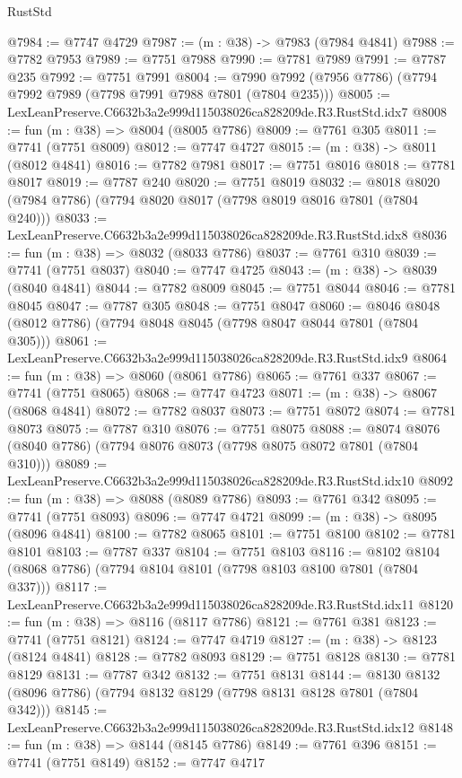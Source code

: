 \begin{lexlean}{RustStd}
\begin{coremodule}
@7984 := @7747 @4729
@7987 := (m : @38) -> @7983 (@7984 @4841)
@7988 := @7782 @7953
@7989 := @7751 @7988
@7990 := @7781 @7989
@7991 := @7787 @235
@7992 := @7751 @7991
@8004 := @7990 @7992 (@7956 @7786) (@7794 @7992 @7989 (@7798 @7991 @7988 @7801 (@7804 @235)))
@8005 := LexLeanPreserve.C6632b3a2e999d115038026ca828209de.R3.RustStd.idx7
@8008 := fun (m : @38) => @8004 (@8005 @7786)
@8009 := @7761 @305
@8011 := @7741 (@7751 @8009)
@8012 := @7747 @4727
@8015 := (m : @38) -> @8011 (@8012 @4841)
@8016 := @7782 @7981
@8017 := @7751 @8016
@8018 := @7781 @8017
@8019 := @7787 @240
@8020 := @7751 @8019
@8032 := @8018 @8020 (@7984 @7786) (@7794 @8020 @8017 (@7798 @8019 @8016 @7801 (@7804 @240)))
@8033 := LexLeanPreserve.C6632b3a2e999d115038026ca828209de.R3.RustStd.idx8
@8036 := fun (m : @38) => @8032 (@8033 @7786)
@8037 := @7761 @310
@8039 := @7741 (@7751 @8037)
@8040 := @7747 @4725
@8043 := (m : @38) -> @8039 (@8040 @4841)
@8044 := @7782 @8009
@8045 := @7751 @8044
@8046 := @7781 @8045
@8047 := @7787 @305
@8048 := @7751 @8047
@8060 := @8046 @8048 (@8012 @7786) (@7794 @8048 @8045 (@7798 @8047 @8044 @7801 (@7804 @305)))
@8061 := LexLeanPreserve.C6632b3a2e999d115038026ca828209de.R3.RustStd.idx9
@8064 := fun (m : @38) => @8060 (@8061 @7786)
@8065 := @7761 @337
@8067 := @7741 (@7751 @8065)
@8068 := @7747 @4723
@8071 := (m : @38) -> @8067 (@8068 @4841)
@8072 := @7782 @8037
@8073 := @7751 @8072
@8074 := @7781 @8073
@8075 := @7787 @310
@8076 := @7751 @8075
@8088 := @8074 @8076 (@8040 @7786) (@7794 @8076 @8073 (@7798 @8075 @8072 @7801 (@7804 @310)))
@8089 := LexLeanPreserve.C6632b3a2e999d115038026ca828209de.R3.RustStd.idx10
@8092 := fun (m : @38) => @8088 (@8089 @7786)
@8093 := @7761 @342
@8095 := @7741 (@7751 @8093)
@8096 := @7747 @4721
@8099 := (m : @38) -> @8095 (@8096 @4841)
@8100 := @7782 @8065
@8101 := @7751 @8100
@8102 := @7781 @8101
@8103 := @7787 @337
@8104 := @7751 @8103
@8116 := @8102 @8104 (@8068 @7786) (@7794 @8104 @8101 (@7798 @8103 @8100 @7801 (@7804 @337)))
@8117 := LexLeanPreserve.C6632b3a2e999d115038026ca828209de.R3.RustStd.idx11
@8120 := fun (m : @38) => @8116 (@8117 @7786)
@8121 := @7761 @381
@8123 := @7741 (@7751 @8121)
@8124 := @7747 @4719
@8127 := (m : @38) -> @8123 (@8124 @4841)
@8128 := @7782 @8093
@8129 := @7751 @8128
@8130 := @7781 @8129
@8131 := @7787 @342
@8132 := @7751 @8131
@8144 := @8130 @8132 (@8096 @7786) (@7794 @8132 @8129 (@7798 @8131 @8128 @7801 (@7804 @342)))
@8145 := LexLeanPreserve.C6632b3a2e999d115038026ca828209de.R3.RustStd.idx12
@8148 := fun (m : @38) => @8144 (@8145 @7786)
@8149 := @7761 @396
@8151 := @7741 (@7751 @8149)
@8152 := @7747 @4717

\end{coremodule}
\end{lexlean}
